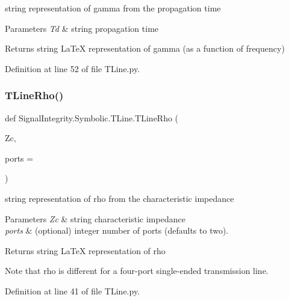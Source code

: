 string representation of gamma from the propagation time 


\begin{DoxyParams}{Parameters}
{\em Td} & string propagation time \\
\hline
\end{DoxyParams}
\begin{DoxyReturn}{Returns}
string La\+TeX representation of gamma (as a function of frequency) 
\end{DoxyReturn}


Definition at line 52 of file T\+Line.\+py.

\mbox{\label{namespaceSignalIntegrity_1_1Symbolic_1_1TLine_a6e67758dfbb8c37100cd86a52783b20c}} 
\subsubsection{\texorpdfstring{T\+Line\+Rho()}{TLineRho()}}
{\footnotesize\ttfamily def Signal\+Integrity.\+Symbolic.\+T\+Line.\+T\+Line\+Rho (\begin{DoxyParamCaption}\item[{}]{Zc,  }\item[{}]{ports = {} }\end{DoxyParamCaption})}



string representation of rho from the characteristic impedance 


\begin{DoxyParams}{Parameters}
{\em Zc} & string characteristic impedance \\
\hline
{\em ports} & (optional) integer number of ports (defaults to two). \\
\hline
\end{DoxyParams}
\begin{DoxyReturn}{Returns}
string La\+TeX representation of rho 
\end{DoxyReturn}
\begin{DoxyNote}{Note}
that rho is different for a four-\/port single-\/ended transmission line. 
\end{DoxyNote}


Definition at line 41 of file T\+Line.\+py.

